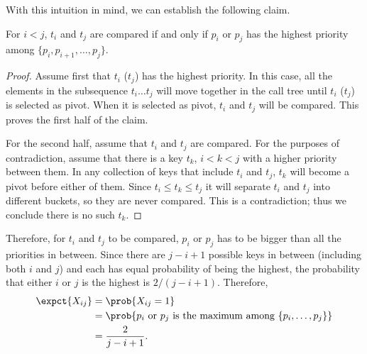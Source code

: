 {With this intuition in mind, we can establish the following claim.
\begin{claim}
  For $i < j$, $t_i$ and $t_j$ are compared if and only if $p_i$ or $p_j$ has the highest
  priority among $\{p_i, p_{i+1},\dots, p_j\}$.
\end{claim}
\begin{proof}
Assume first that $t_i$ ($t_j$) has the highest priority.  In this
case, all the elements in the subsequence $t_i \ldots t_j$ will move
together in the call tree until $t_i$ ($t_j$) is selected as pivot.
%
When it is selected as pivot, $t_i$ and $t_j$ will be compared. 
%
This proves the first half of the claim.

For the second half, assume that $t_i$ and $t_j$ are compared.  For
the purposes of contradiction, assume that there is a key $t_k$, $i <
k < j$ with a higher priority between them.  In any collection of keys
that include $t_i$ and $t_j$, $t_k$ will become a pivot before either
of them.  Since $t_i \leq t_k \leq t_j$ it will separate $t_i$ and
$t_j$ into different buckets, so they are never compared.  This is a
contradiction; thus we conclude there is no such $t_k$.
\end{proof}

Therefore, for $t_i$ and $t_j$ to be compared, $p_i$ or $p_j$ has to
be bigger than all the priorities in between.  
%
Since there are $j-i+1$ possible keys in between (including both $i$
and $j$) and each has equal probability of being the highest, the
probability that either $i$ or $j$ is the highest is $2/(j-i+1)$.
%
Therefore,
%
\begin{align*}
  \expct{X_{ij}} &= \prob{X_{ij} = 1} \\
  &= \prob{p_i \text{ or } p_j \text{ is the maximum among } \{p_i, \dots, p_j\}} \\
  &= \frac{2}{j - i + 1}.
\end{align*}




}
